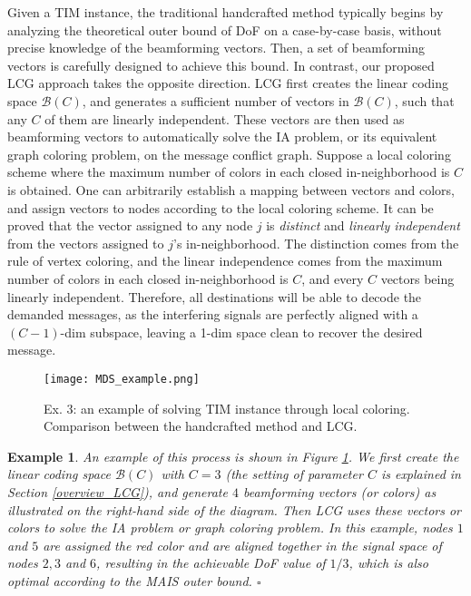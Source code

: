 \documentclass[a4paper,journal]{IEEEtran}
\newtheorem{exe}{Example}
\begin{document}
Given a TIM instance, the traditional handcrafted method \cite{jafar2013topological,sun2014topologicalMIMO, maleki2014index} typically begins by analyzing the theoretical outer bound of DoF on a case-by-case basis, without precise knowledge of the beamforming vectors. Then, a set of beamforming vectors is carefully designed to achieve this bound. In contrast, our proposed LCG approach takes the opposite direction. LCG first creates the linear coding space $\mathcal{B}(C)$, and generates a sufficient number of vectors in $\mathcal{B}(C)$, such that any $C$ of them are linearly independent. These vectors are then used as beamforming vectors to automatically solve the IA problem, or its equivalent graph coloring problem, on the message conflict graph. Suppose a local coloring scheme where the maximum number of colors in each closed in-neighborhood is $C$ is obtained. One can arbitrarily establish a mapping between vectors and colors, and assign vectors to nodes according to the local coloring scheme. It can be proved that the vector assigned to any node $j$ is \textit{distinct} and \textit{linearly independent} from the vectors assigned to $j$'s in-neighborhood. The distinction comes from the rule of vertex coloring, and the linear independence comes from the maximum number of colors in each closed in-neighborhood is $C$, and every $C$ vectors being linearly independent. Therefore, all destinations will be able to decode the demanded messages, as the interfering signals are perfectly aligned with a $(C-1)$-dim subspace, leaving a 1-dim space clean to recover the desired message. 
\begin{figure}[htbp]
	\begin{center}
		\texttt{[image: MDS\_example.png]}
	\end{center}
	\caption{Ex. 3: an example of solving TIM instance through local coloring. Comparison between the handcrafted method and LCG.}
	\label{MDS_exaple}
\end{figure}
\begin{exe}
An example of this process is shown in Figure \ref{MDS_exaple}. We first create the linear coding space $\mathcal{B}(C)$ with $C=3$ (the setting of parameter $C$ is explained in Section \ref{overview_LCG}), and generate $4$ beamforming vectors (or colors) as illustrated on the right-hand side of the diagram. Then LCG uses these vectors or colors to solve the IA problem or graph coloring problem. In this example, nodes $1$ and $5$ are assigned the red color and are aligned together in the signal space of nodes $2,3$ and $6$, resulting in the achievable DoF value of $1/3$, which is also optimal according to the MAIS outer bound. \hfill $\square$
\end{exe}
\end{document}
